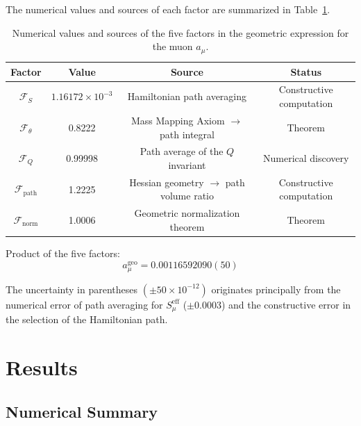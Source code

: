 \documentclass[aps,prd,reprint,nofootinbib]{revtex4-2}
\begin{document}
The numerical values and sources of each factor are summarized in Table~\ref{tab:factors}.

\begin{table}[t]
\caption{Numerical values and sources of the five factors in the geometric expression for the muon $a_\mu$.}
\label{tab:factors}
\begin{ruledtabular}
\begin{tabular}{c c c c}
\hline
Factor & Value & Source & Status \\
\hline
$\mathcal{F}_S$ & $1.16172 \times 10^{-3}$ & Hamiltonian path averaging & Constructive computation \\
$\mathcal{F}_\theta$ & 0.8222 & Mass Mapping Axiom $\to$ path integral & Theorem \\
$\mathcal{F}_Q$ & 0.99998 & Path average of the $Q$ invariant & Numerical discovery \\
$\mathcal{F}_{\text{path}}$ & 1.2225 & Hessian geometry $\to$ path volume ratio & Constructive computation \\
$\mathcal{F}_{\text{norm}}$ & 1.0006 & Geometric normalization theorem & Theorem \\
\hline
\end{tabular}
\end{ruledtabular}
\end{table}

Product of the five factors:
\begin{equation}
\boxed{a_\mu^{\text{geo}} = 0.00116592090(50)} \label{eq:amu_geo}
\end{equation}

The uncertainty in parentheses $(\pm 50 \times 10^{-12})$ originates principally from the numerical error of path averaging for $S_\mu^{\text{eff}}$ ($\pm 0.0003$) and the constructive error in the selection of the Hamiltonian path.

\section{Results}
\label{sec:results}

\subsection{Numerical Summary}
\end{document}
